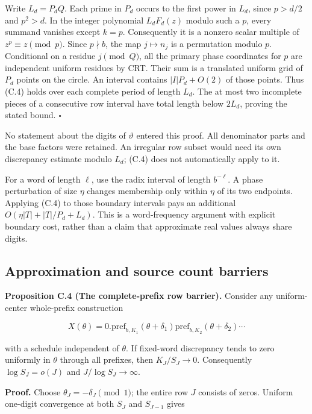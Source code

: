 \documentclass[11pt,a4paper]{article}
\begin{document}
Write \(L_d=P_dQ\). Each prime in \(P_d\) occurs to the first power in
\(L_d\), since \(p>d/2\) and \(p^2>d\). In the integer polynomial
\(L_dF_d(z)\) modulo such a \(p\), every summand vanishes except
\(k=p\). Consequently it is a nonzero scalar multiple of
\(z^p\equiv z\pmod p\). Since \(p\nmid b\), the map \(j\mapsto n_j\) is
a permutation modulo \(p\). Conditional on a residue \(j\pmod Q\), all
the primary phase coordinates for \(p\) are independent uniform residues
by CRT. Their sum is a translated uniform grid of \(P_d\) points on the
circle. An interval contains \(|I|P_d+O(2)\) of those points. Thus (C.4)
holds over each complete period of length \(L_d\). The at most two
incomplete pieces of a consecutive row interval have total length below
\(2L_d\), proving the stated bound. \(\square\)

No statement about the digits of \(\vartheta\) entered this proof. All
denominator parts and the base factors were retained. An irregular row
subset would need its own discrepancy estimate modulo \(L_d\); (C.4)
does not automatically apply to it.

For a word of length \(\ell\), use the radix interval of length
\(b^{-\ell}\). A phase perturbation of size \(\eta\) changes membership
only within \(\eta\) of its two endpoints. Applying (C.4) to those
boundary intervals pays an additional \(O(\eta |T|+|T|/P_d+L_d)\). This
is a word-frequency argument with explicit boundary cost, rather than a
claim that approximate real values always share digits.

\subsection{Approximation and source count
barriers}\label{approximation-and-source-count-barriers}

\textbf{Proposition C.4 (The complete-prefix row barrier).} Consider any
uniform-center whole-prefix construction

\[
X(\theta)=0.\mathrm{pref}_{b,K_1}(\theta+\delta_1)
\mathrm{pref}_{b,K_2}(\theta+\delta_2)\cdots
\]

with a schedule independent of \(\theta\). If fixed-word discrepancy
tends to zero uniformly in \(\theta\) through all prefixes, then
\(K_J/S_J\to0\). Consequently \(\log S_J=o(J)\) and
\(J/\log S_J\to\infty\).

\textbf{Proof.} Choose \(\theta_J=-\delta_J\pmod1\); the entire row
\(J\) consists of zeros. Uniform one-digit convergence at both \(S_J\)
and \(S_{J-1}\) gives
\end{document}

